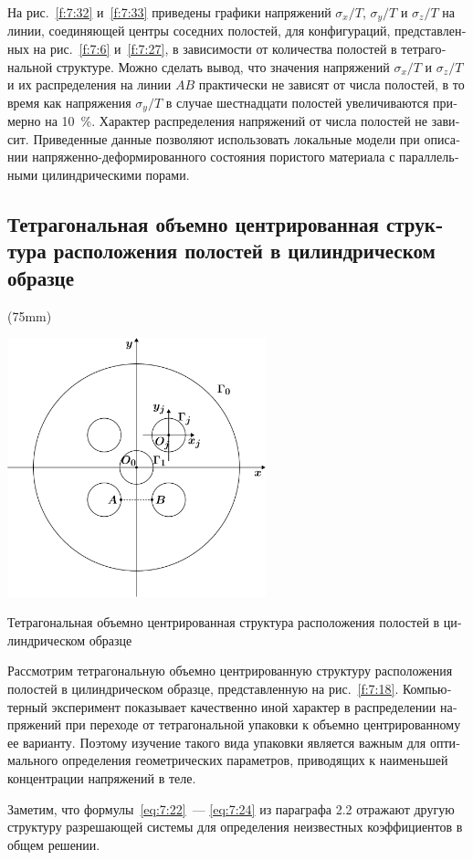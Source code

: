 \begin{russian}
На рис.~\ref{f:7:32} и~\ref{f:7:33} приведены графики напряжений $\sigma_x/T$, $\sigma_y/T$ и $\sigma_z/T$ на линии, соединяющей центры соседних полостей, для конфигураций, представленных на рис.~\ref{f:7:6} и~\ref{f:7:27}, в зависимости от количества полостей в тетрагональной структуре. Можно сделать вывод, что значения напряжений $\sigma_x/T$ и $\sigma_z/T$ и их распределения на линии $AB$ практически не зависят от числа полостей, в то время как напряжения $\sigma_y/T$ в случае шестнадцати полостей увеличиваются примерно на 10~\%. Характер распределения напряжений от числа полостей не зависит. Приведенные данные позволяют использовать локальные модели при описании напряженно-деформированного состояния пористого материала с параллельными цилиндрическими порами.

\subsection{Тетрагональная объемно центрированная структура расположения полостей в цилиндрическом образце}

\sidefig(75mm){
\includegraphics[width=7.5cm]{tetragonal-centroid.pdf}
\caption{Тетрагональная объемно центрированная структура расположения полостей в цилиндрическом образце}
\label{f:7:18}
}{Рассмотрим тетрагональную объемно центрированную структуру расположения полостей в цилиндрическом образце, представленную на рис.~\ref{f:7:18}. Компьютерный эксперимент показывает качественно иной характер в распределении напряжений при переходе от тетрагональной упаковки к объемно центрированному ее варианту. Поэтому изучение такого вида упаковки является важным для оптимального определения геометрических параметров, приводящих к наименьшей концентрации напряжений в теле.
 
Заметим, что формулы~\eqref{eq:7:22}~--- \eqref{eq:7:24} из параграфа 2.2 отражают другую структуру разрешающей системы для определения неизвестных коэффициентов в общем решении.
}


\end{russian}
